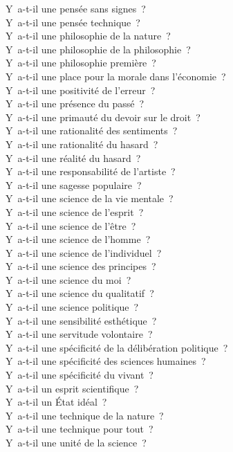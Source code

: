 \documentclass[a4paper,12pt]{article}
\begin{document}
Y a-t-il une pensée sans signes ? \\
Y a-t-il une pensée technique ? \\
Y a-t-il une philosophie de la nature ? \\
Y a-t-il une philosophie de la philosophie ? \\
Y a-t-il une philosophie première ? \\
Y a-t-il une place pour la morale dans l'économie ? \\
Y a-t-il une positivité de l'erreur ? \\
Y a-t-il une présence du passé ? \\
Y a-t-il une primauté du devoir sur le droit ? \\
Y a-t-il une rationalité des sentiments ? \\
Y a-t-il une rationalité du hasard ? \\
Y a-t-il une réalité du hasard ? \\
Y a-t-il une responsabilité de l'artiste ? \\
Y a-t-il une sagesse populaire ? \\
Y a-t-il une science de la vie mentale ? \\
Y a-t-il une science de l'esprit ? \\
Y a-t-il une science de l'être ? \\
Y a-t-il une science de l'homme ? \\
Y a-t-il une science de l'individuel ? \\
Y a-t-il une science des principes ? \\
Y a-t-il une science du moi ? \\
Y a-t-il une science du qualitatif ? \\
Y a-t-il une science politique ? \\
Y a-t-il une sensibilité esthétique ? \\
Y a-t-il une servitude volontaire ? \\
Y a-t-il une spécificité de la délibération politique ? \\
Y a-t-il une spécificité des sciences humaines ? \\
Y a-t-il une spécificité du vivant ? \\
Y a-t-il un esprit scientifique ? \\
Y a-t-il un État idéal ? \\
Y a-t-il une technique de la nature ? \\
Y a-t-il une technique pour tout ? \\
Y a-t-il une unité de la science ? \\
\end{document}

